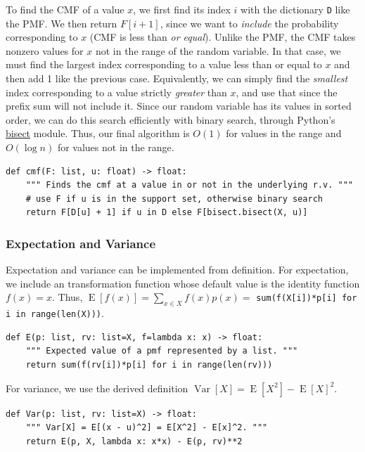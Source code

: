 \documentclass[11pt, oneside]{article}
\DeclareMathOperator{\E}{E}
\DeclareMathOperator{\Var}{Var}
\theoremstyle{plain}
\theoremstyle{definition}
\begin{document}
To find the CMF of a value \( x \), we first find its index \( i \) with
the dictionary \texttt{D} like the PMF. We then return \( F[i + 1] \),
since we want to \textit{include} the probability corresponding to \( x
\) (CMF is less than \textit{or equal}). Unlike the PMF, the CMF takes
nonzero values for \( x \) not in the range of the random variable. In that
case, we must find the largest index corresponding to a value less than
or equal to \( x \) and then add 1 like the previous case. Equivalently,
we can simply find the \textit{smallest} index corresponding to a value
strictly \textit{greater} than \( x \), and use that since the prefix sum
will not include it. Since our random variable has its values in sorted
order, we can do this search efficiently with binary search, through
Python's \href{https://docs.python.org/3/library/bisect.html}{bisect}
module. Thus, our final algorithm is \( O(1) \) for values in the range
and \( O(\log n) \) for values not in the range.
\begin{verbatim}
def cmf(F: list, u: float) -> float:
    """ Finds the cmf at a value in or not in the underlying r.v. """
    # use F if u is in the support set, otherwise binary search
    return F[D[u] + 1] if u in D else F[bisect.bisect(X, u)]
\end{verbatim}

\subsubsection{Expectation and Variance}
Expectation and variance can be implemented from definition.
For expectation, we include an transformation function whose
default value is the identity function \( f(x) = x \).
Thus, \( \E[f(x)] = \sum_{x \in X} f(x) p(x) = \)
\texttt{sum(f(X[i])*p[i] for i in range(len(X)))}.
\begin{verbatim}
def E(p: list, rv: list=X, f=lambda x: x) -> float:
    """ Expected value of a pmf represented by a list. """
    return sum(f(rv[i])*p[i] for i in range(len(rv)))
\end{verbatim}

For variance, we use the derived definition \( \Var[X] = \E[X^2] - \E[X]^2 \).
\begin{verbatim}
def Var(p: list, rv: list=X) -> float:
    """ Var[X] = E[(x - u)^2] = E[X^2] - E[x]^2. """
    return E(p, X, lambda x: x*x) - E(p, rv)**2
\end{verbatim}
\end{document}
